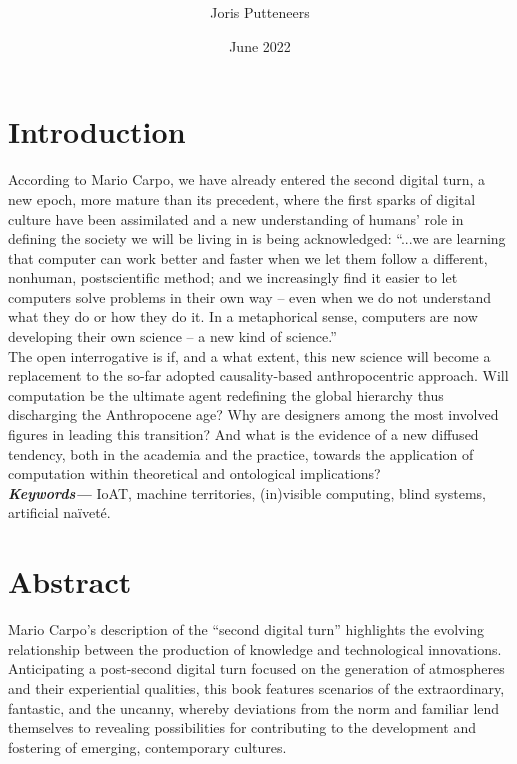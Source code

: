 \documentclass[10pt]{article}
\title{\textbf{\xs}}
\author{Joris Putteneers}
\date{June 2022}
\newcommand\z{black} %
\newcommand\w{blue} %
\newcommand\q{white} %
\providecommand{\keywords}[1]
{
  \small	
  \textbf{\textit{Keywords---}} #1
}
\begin{document}
\color{\z}
\pagecolor{\q}

\pagestyle{plain} %

\maketitle

\tableofcontents

\section*{Introduction}
According to Mario Carpo, we have already entered the second digital turn, a new epoch, more mature than its precedent, where the first sparks of digital culture have been assimilated and a new understanding of humans’ role in defining the society we will be living in is being acknowledged: “...we are learning that computer can work better and faster when we let them follow a different, nonhuman, postscientific method; and we increasingly find it easier to let computers solve problems in their own way – even when we do not understand what they do or how they do it. In a metaphorical sense, computers are now developing their own science – a new kind of science.” \cite{DUMMY:1} \\

The open interrogative is if, and a what extent, this new science will become a replacement to the so-far adopted causality-based anthropocentric approach. Will computation be the ultimate agent redefining the global hierarchy thus discharging the Anthropocene age? Why are designers among the most involved figures in leading this transition? And what is the evidence of a new diffused tendency, both in the academia and the practice, towards the application of computation within theoretical and ontological implications?
 \\


\keywords{{\color{\w}IoAT, machine territories, (in)visible computing, blind systems, artificial naïveté.}}

\section{Abstract}
Mario Carpo's description of the “second digital turn” highlights the evolving relationship between the production of knowledge and technological innovations. Anticipating a post-second digital turn focused on the generation of atmospheres and their experiential qualities, this book features scenarios of the extraordinary, fantastic, and the uncanny, whereby deviations from the norm and familiar lend themselves to revealing possibilities for contributing to the development and fostering of emerging, contemporary cultures.
\end{document}
